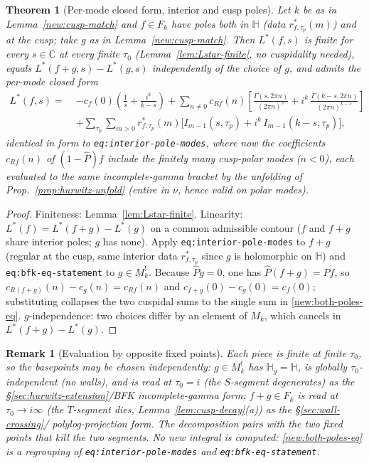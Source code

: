 \documentclass[11pt]{article}
\newtheorem{theorem}{Theorem}\newtheorem{lemma}{Lemma}
\newtheorem{remark}{Remark}
\newcommand{\HH}{\mathbb{H}}\newcommand{\ZZ}{\mathbb{Z}}
\newcommand{\CC}{\mathbb{C}}\newcommand{\QQ}{\mathbb{Q}}
\newcommand{\Phat}{\widehat{P}}
\begin{document}
\begin{theorem}[Per-mode closed form, interior and cusp poles]\label{new:both-poles}
Let $k$ be as in Lemma~\ref{new:cusp-match} and $f\in F_k$ have poles
both in $\HH$ (data $r^*_{f,\tau_p}(m)$) and at the cusp; take $g$ as in
Lemma~\ref{new:cusp-match}. Then $L^*(f,s)$ is finite for every
$s\in\CC$ at every finite $\tau_0$ (Lemma~\ref{lem:Lstar-finite}, no
cuspidality needed), equals $L^*(f+g,s)-L^*(g,s)$ independently of the
choice of $g$, and admits the per-mode closed form
\begin{equation}\label{new:both-poles-eq}
\begin{aligned}
 L^*(f,s)=\;& -c_f(0)\!\left(\frac1s+\frac{i^k}{k-s}\right)
 + \sum_{n\ne 0} c_{Rf}(n)\!\left[\frac{\Gamma(s,2\pi n)}{(2\pi n)^s}
   + i^k\,\frac{\Gamma(k-s,2\pi n)}{(2\pi n)^{k-s}}\right]\\
 &+ \sum_{\tau_p}\sum_{m>0} r^*_{f,\tau_p}(m)
   \bigl[I_{m-1}(s,\tau_p)+i^k\,I_{m-1}(k-s,\tau_p)\bigr],
\end{aligned}
\end{equation}
identical in form to \texttt{eq:interior-pole-modes}, where now the
coefficients $c_{Rf}(n)$ of $(1-\Phat)f$ include the finitely many
cusp-polar modes ($n<0$), each evaluated to the same incomplete-gamma
bracket by the unfolding of Prop.~\ref{prop:hurwitz-unfold} (entire in
$\nu$, hence valid on polar modes).
\end{theorem}
\begin{proof}
Finiteness: Lemma~\ref{lem:Lstar-finite}. Linearity:
$L^*(f)=L^*(f+g)-L^*(g)$ on a common admissible contour ($f$ and $f+g$
share interior poles; $g$ has none). Apply
\texttt{eq:interior-pole-modes} to $f+g$ (regular at the cusp, same
interior data $r^*_{f,\tau_p}$ since $g$ is holomorphic on $\HH$) and
\texttt{eq:bfk-eq-statement} to $g\in M_k^!$. Because $\Phat g=0$, one
has $\Phat(f+g)=\Phat f$, so
$c_{R(f+g)}(n)-c_g(n)=c_{Rf}(n)$ and $c_{f+g}(0)-c_g(0)=c_f(0)$;
substituting collapses the two cuspidal sums to the single sum in
\eqref{new:both-poles-eq}. $g$-independence: two choices differ by an
element of $M_k$, which cancels in $L^*(f+g)-L^*(g)$.
\end{proof}

\begin{remark}[Evaluation by opposite fixed points]
Each piece is finite at finite $\tau_0$, so the basepoints may be
chosen independently: $g\in M_k^!$ has $\HH_g=\HH$, is globally
$\tau_0$-independent (no walls), and is read at $\tau_0=i$ (the
$S$-segment degenerates) as the \S\ref{sec:hurwitz-extension}/BFK
incomplete-gamma form; $f+g\in F_k$ is read at $\tau_0\to i\infty$ (the
$T$-segment dies, Lemma~\ref{lem:cusp-decay}(a)) as the
\S\ref{sec:wall-crossing}/\cite{1806} polylog-projection form. The
decomposition pairs with the two fixed points that kill the two
segments. No new integral is computed: \eqref{new:both-poles-eq} is a
regrouping of \texttt{eq:interior-pole-modes} and
\texttt{eq:bfk-eq-statement}.
\end{remark}
\end{document}
